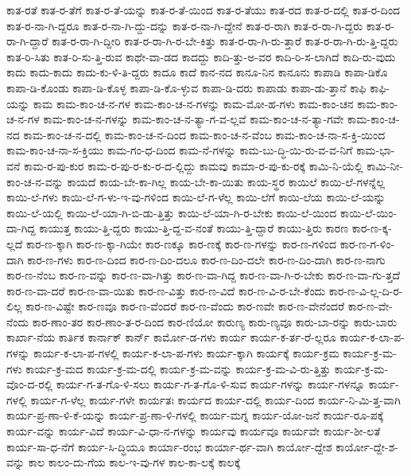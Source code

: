 {ಕಾತ-ರತೆ
ಕಾತ-ರ-ತೆಗೆ
ಕಾತ-ರ-ತೆ-ಯನ್ನು
ಕಾತ-ರ-ತೆ-ಯಿಂದ
ಕಾತ-ರ-ತೆಯು
ಕಾತ-ರದ
ಕಾತ-ರ-ದಲ್ಲಿ
ಕಾತ-ರ-ದಿಂದ
ಕಾತ-ರ-ನಾ-ಗಿ-ದ್ದರೂ
ಕಾತ-ರ-ನಾ-ಗಿ-ದ್ದು-ದನ್ನು
ಕಾತ-ರ-ನಾ-ಗಿ-ದ್ದೇನೆ
ಕಾತ-ರ-ರಾಗಿ
ಕಾತ-ರ-ರಾ-ಗಿ-ದ್ದರು
ಕಾತ-ರ-ರಾ-ಗಿ-ದ್ದಾರೆ
ಕಾತ-ರ-ರಾ-ಗಿ-ದ್ದೀರಿ
ಕಾತ-ರ-ರಾ-ಗಿ-ರ-ಬೇ-ಕಿತ್ತು
ಕಾತ-ರ-ರಾ-ಗಿ-ರು-ತ್ತಾರೆ
ಕಾತ-ರ-ರಾ-ಗಿ-ರು-ತ್ತಿ-ದ್ದರು
ಕಾತ-ರಿ-ಸಿತು
ಕಾತ-ರಿ-ಸು-ತ್ತಿ-ರುವ
ಕಾಥೇ-ವಾ-ಡದ
ಕಾದದ್ದು
ಕಾದಿ-ತ್ತು-ಅ-ವರ
ಕಾದಿ-ರಿ-ಸ-ಲಾಗಿದೆ
ಕಾದಿ-ರು-ವುದು
ಕಾದು
ಕಾದು-ಕಾದು
ಕಾದು-ಕು-ಳಿ-ತಿ-ದ್ದರು
ಕಾದೂ
ಕಾದೆ
ಕಾನ-ನದ
ಕಾನೂ-ನಿನ
ಕಾನೂನು
ಕಾಪಾಡಿ
ಕಾಪಾ-ಡಿಕೊ
ಕಾಪಾ-ಡಿ-ಕೊಂಡು
ಕಾಪಾ-ಡಿ-ಕೊಳ್ಳ
ಕಾಪಾ-ಡಿ-ಕೊ-ಳ್ಳುವ
ಕಾಪಾ-ಡಿ-ದರು
ಕಾಪಾಡು
ಕಾಪಾ-ಡು-ತ್ತಾನೆ
ಕಾಫಿ
ಕಾಫಿ-ಯನ್ನು
ಕಾಮ
ಕಾಮ-ಕಾಂ-ಚ-ನ-ಗಳ
ಕಾಮ-ಕಾಂ-ಚ-ನ-ಗಳನ್ನು
ಕಾಮ-ಮೋ-ಹ-ಗಳು
ಕಾಮ-ಕಾಂ-ಚನ
ಕಾಮ-ಕಾಂ-ಚ-ನ-ಗಳ
ಕಾಮ-ಕಾಂ-ಚ-ನ-ಗಳನ್ನು
ಕಾಮ-ಕಾಂ-ಚ-ನ-ತ್ಯಾ-ಗ-ವ-ಲ್ಲವೆ
ಕಾಮ-ಕಾಂ-ಚ-ನ-ತ್ಯಾ-ಗವೇ
ಕಾಮ-ಕಾಂ-ಚ-ನದ
ಕಾಮ-ಕಾಂ-ಚ-ನ-ದಲ್ಲಿ
ಕಾಮ-ಕಾಂ-ಚ-ನ-ದಿಂದ
ಕಾಮ-ಕಾಂ-ಚ-ನ-ವೆಂಬ
ಕಾಮ-ಕಾಂ-ಚ-ನಾ-ಸ-ಕ್ತಿ-ಯಿಂದ
ಕಾಮ-ಕಾಂ-ಚ-ನಾ-ಸ-ಕ್ತಿಯು
ಕಾಮ-ಗಂ-ಧ-ದಿಂದ
ಕಾಮ-ನೆ-ಗಳನ್ನು
ಕಾಮ-ಬು-ದ್ಧಿ-ಯಿ-ರು-ವ-ವ-ನಿಗೆ
ಕಾಮ-ಭಾ-ವನೆ
ಕಾಮ-ರ-ಪು-ಕುರ
ಕಾಮ-ರ-ಪು-ರ-ಕು-ರ-ದ-ಲ್ಲಿದ್ದು
ಕಾಮವು
ಕಾಮಾ-ರ-ಪು-ಕು-ರಕ್ಕೆ
ಕಾಮಿ-ನಿ-ಯೆಲ್ಲಿ
ಕಾಮಿ-ನೀ-ಕಾಂ-ಚ-ನ-ವನ್ನು
ಕಾಯದೆ
ಕಾಯ-ಬೇ-ಕಾ-ಗಿಲ್ಲ
ಕಾಯ-ಬೇ-ಕಾ-ಯಿತು
ಕಾಯ-ಸ್ಥರ
ಕಾಯಿಲೆ
ಕಾಯಿ-ಲೆ-ಗಳನ್ನೆಲ್ಲ
ಕಾಯಿ-ಲೆ-ಗಳು
ಕಾಯಿ-ಲೆ-ಗ-ಳು-ಇ-ವು-ಗಳಿಂದ
ಕಾಯಿ-ಲೆ-ಗ-ಳೆಲ್ಲ
ಕಾಯಿ-ಲೆಗೆ
ಕಾಯಿ-ಲೆಯ
ಕಾಯಿ-ಲೆ-ಯನ್ನು
ಕಾಯಿ-ಲೆ-ಯಲ್ಲಿ
ಕಾಯಿ-ಲೆ-ಯಾ-ಗಿ-ಬಿ-ಡು-ತ್ತಿತ್ತು
ಕಾಯಿ-ಲೆ-ಯಾ-ಗಿ-ರ-ಬೇಕು
ಕಾಯಿ-ಲೆ-ಯಿಂದ
ಕಾಯಿ-ಲೆ-ಯಿಂ-ದಾ-ಗಿದ್ದ
ಕಾಯುತ್ತ
ಕಾಯು-ತ್ತಿ-ದ್ದರು
ಕಾಯು-ತ್ತಿ-ದ್ದ-ವ-ನಂತೆ
ಕಾಯು-ತ್ತಿ-ದ್ದಾರೆ
ಕಾಯು-ತ್ತಿರು
ಕಾರಣ
ಕಾರ-ಣ-ಕ್ಕ-ಲ್ಲದೆ
ಕಾರ-ಣ-ಕ್ಕಾಗಿ
ಕಾರ-ಣ-ಕ್ಕಾ-ಗಿಯೇ
ಕಾರ-ಣಕ್ಕೂ
ಕಾರ-ಣಕ್ಕೆ
ಕಾರ-ಣ-ಗಳನ್ನು
ಕಾರ-ಣ-ಗಳಿಂದ
ಕಾರ-ಣ-ಗ-ಳಿಂ-ದಾಗಿ
ಕಾರ-ಣ-ಗಳು
ಕಾರ-ಣ-ದಿಂದ
ಕಾರ-ಣ-ದಿಂ-ದಲೂ
ಕಾರ-ಣ-ದಿಂ-ದಲೇ
ಕಾರ-ಣ-ದಿಂ-ದಾಗಿ
ಕಾರ-ಣ-ನಾಗು
ಕಾರ-ಣ-ನೆಂಬ
ಕಾರ-ಣ-ವನ್ನು
ಕಾರ-ಣ-ವಾ-ಗಿತ್ತು
ಕಾರ-ಣ-ವಾ-ಗಿದ್ದ
ಕಾರ-ಣ-ವಾ-ಗಿ-ರ-ಬೇಕು
ಕಾರ-ಣ-ವಾ-ಗು-ತ್ತದೆ
ಕಾರ-ಣ-ವಾ-ದರೆ
ಕಾರ-ಣ-ವಾ-ಯಿತು
ಕಾರ-ಣ-ವಿತ್ತು
ಕಾರ-ಣ-ವಿದೆ
ಕಾರ-ಣ-ವಿ-ರ-ಬೇ-ಕೆಂದು
ಕಾರ-ಣ-ವಿ-ಲ್ಲ-ದಿ-ರ-ಲಿಲ್ಲ
ಕಾರ-ಣ-ವಿಷ್ಟೇ
ಕಾರ-ಣವೂ
ಕಾರ-ಣ-ವೆಂದರೆ
ಕಾರ-ಣ-ವೆಂದು
ಕಾರ-ಣವೇ
ಕಾರ-ಣ-ವೇನೆಂದರೆ
ಕಾರ-ಣ-ವೇ-ನೆಂದು
ಕಾರ-ಣಾಂ-ತರ
ಕಾರ-ಣಾಂ-ತ-ರ-ದಿಂದ
ಕಾರ-ಣಿಯೋ
ಕಾರುಣ್ಯ
ಕಾರು-ಣ್ಯವೂ
ಕಾರು-ಬಾ-ರನ್ನು
ಕಾರು-ಬಾರು
ಕಾರ್ಖಾ-ನೆಯ
ಕಾರ್ತಿಕ
ಕಾರ್ನಾಕ್
ಕಾರ್ನ್
ಕಾರ್ಮೋ-ಡ-ಗಳು
ಕಾರ್ಯ
ಕಾರ್ಯ-ಕ-ರ್ತ-ರೆ-ಲ್ಲರೂ
ಕಾರ್ಯ-ಕ-ಲಾ-ಪ-ಗಳನ್ನು
ಕಾರ್ಯ-ಕ-ಲಾ-ಪ-ಗಳಲ್ಲಿ
ಕಾರ್ಯ-ಕ-ಲಾ-ಪ-ಗಳು
ಕಾರ್ಯ-ಕ್ಕಾಗಿ
ಕಾರ್ಯಕ್ಕೆ
ಕಾರ್ಯ-ಕ್ರಮ
ಕಾರ್ಯ-ಕ್ರ-ಮ-ಗಳು
ಕಾರ್ಯ-ಕ್ರ-ಮದ
ಕಾರ್ಯ-ಕ್ರ-ಮ-ದಲ್ಲಿ
ಕಾರ್ಯ-ಕ್ರ-ಮ-ವನ್ನು
ಕಾರ್ಯ-ಕ್ರ-ಮ-ವಿ-ರು-ತ್ತಿತ್ತು
ಕಾರ್ಯ-ಕ್ರ-ಮ-ವೊಂ-ದ-ರಲ್ಲಿ
ಕಾರ್ಯ-ಗ-ತ-ಗೊ-ಳಿ-ಸಲು
ಕಾರ್ಯ-ಗ-ತ-ಗೊ-ಳಿ-ಸುವ
ಕಾರ್ಯ-ಗಳನ್ನು
ಕಾರ್ಯ-ಗಳನ್ನೂ
ಕಾರ್ಯ-ಗಳಲ್ಲಿ
ಕಾರ್ಯ-ಗ-ಳೆಲ್ಲ
ಕಾರ್ಯ-ಗಳೇ
ಕಾರ್ಯತಃ
ಕಾರ್ಯದ
ಕಾರ್ಯ-ದಲ್ಲಿ
ಕಾರ್ಯ-ದಿಂದ
ಕಾರ್ಯ-ನಿ-ಮಿ-ತ್ತ-ವಾಗಿ
ಕಾರ್ಯ-ಪ್ರ-ಣಾ-ಳಿ-ಕೆ-ಯನ್ನು
ಕಾರ್ಯ-ಪ್ರ-ಣಾ-ಳಿ-ಗಳಲ್ಲಿ
ಕಾರ್ಯ-ಮಗ್ನ
ಕಾರ್ಯ-ಯೋ-ಜನೆ
ಕಾರ್ಯ-ರೂ-ಪಕ್ಕೆ
ಕಾರ್ಯ-ವನ್ನು
ಕಾರ್ಯ-ವಿದೆ
ಕಾರ್ಯ-ವಿ-ಧಾ-ನ-ಗಳನ್ನು
ಕಾರ್ಯವು
ಕಾರ್ಯವೂ
ಕಾರ್ಯವೇ
ಕಾರ್ಯ-ಶೀ-ಲತೆ
ಕಾರ್ಯ-ಸಾ-ಧ-ನೆಗೆ
ಕಾರ್ಯ-ಸಿ-ದ್ಧಿಯೂ
ಕಾರ್ಯಾ-ರಂಭ
ಕಾರ್ಯಾ-ರ್ಥ-ವಾಗಿ
ಕಾರ್ಯೋ-ದ್ದೇಶ
ಕಾರ್ಯೋ-ದ್ದೇ-ಶ-ವನ್ನು
ಕಾಲ
ಕಾಲಂ-ದು-ಗೆಯ
ಕಾಲ-ಇ-ವು-ಗಳ
ಕಾಲ-ಕಾ-ಲಕ್ಕೆ
ಕಾಲಕ್ಕೆ
}
